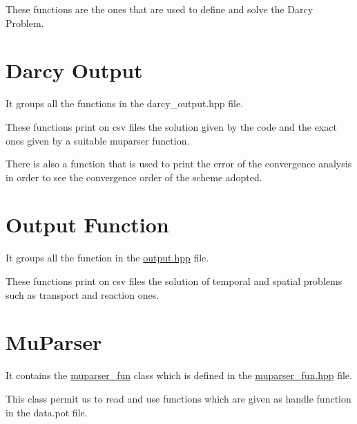 These functions are the ones that are used to define and solve the Darcy Problem.

\section*{Darcy Output}

It groups all the functions in the darcy\+\_\+output.\+hpp file.

These functions print on csv files the solution given by the code and the exact ones given by a suitable muparser function.

There is also a function that is used to print the error of the convergence analysis in order to see the convergence order of the scheme adopted.

\section*{Output Function}

It groups all the function in the \hyperlink{output_8hpp_source}{output.\+hpp} file.

These functions print on csv files the solution of temporal and spatial problems such as transport and reaction ones.

\section*{Mu\+Parser}

It contains the \hyperlink{classmuparser__fun}{muparser\+\_\+fun} class which is defined in the \hyperlink{muparser__fun_8hpp_source}{muparser\+\_\+fun.\+hpp} file.

This class permit us to read and use functions which are given as handle function in the data.\+pot file. 